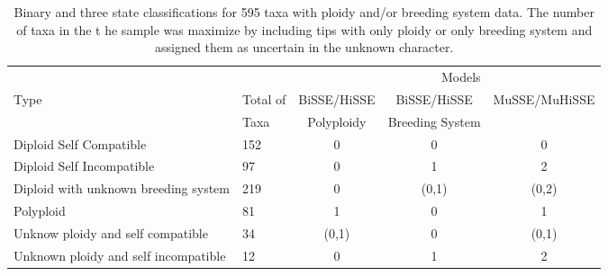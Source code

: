 \begin{table}
\begin{tabular}{@{}llccc@{}} \toprule
\multicolumn{4}{r}{Models} \\ \cmidrule(r){3-5}
Type & Total of & BiSSE/HiSSE & BiSSE/HiSSE & MuSSE/MuHiSSE\\ 
 &Taxa &  Polyploidy & Breeding System &  \\ \midrule
Diploid Self Compatible & 152 & 0 &  0 & 0 \\
Diploid Self Incompatible& 97 & 0  & 1 & 2\\
Diploid with unknown breeding system & 219 & 0 & (0,1) & (0,2) \\
Polyploid & 81 & 1& 0 & 1 \\
Unknow ploidy and self compatible& 34 & (0,1)& 0 & (0,1) \\ 
Unknown ploidy and self incompatible & 12 & 0 & 1 & 2 \\ \bottomrule
\end{tabular}
\caption{Binary and three state classifications for 595 taxa with ploidy and/or breeding system data. The number of taxa in the t he sample was maximize by including tips with only ploidy or only breeding system and assigned them as uncertain in the unknown character.}
\label{table:datatable}
\end{table}
